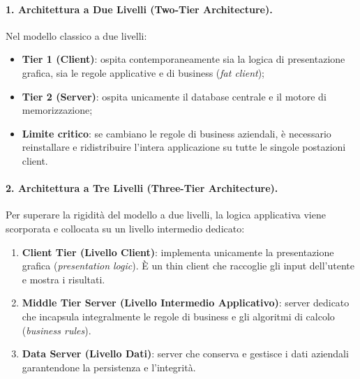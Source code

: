 \documentclass[12pt]{extarticle}
\begin{document}
\paragraph{1. Architettura a Due Livelli (Two-Tier Architecture).}
Nel modello classico a due livelli:
\begin{itemize}
    \item \textbf{Tier 1 (Client)}: ospita contemporaneamente sia la logica di presentazione grafica, sia le regole applicative e di business (\textit{fat client});
    \item \textbf{Tier 2 (Server)}: ospita unicamente il database centrale e il motore di memorizzazione;
    \item \textbf{Limite critico}: se cambiano le regole di business aziendali, è necessario reinstallare e ridistribuire l'intera applicazione su tutte le singole postazioni client.
\end{itemize}

\paragraph{2. Architettura a Tre Livelli (Three-Tier Architecture).}
Per superare la rigidità del modello a due livelli, la logica applicativa viene scorporata e collocata su un livello intermedio dedicato:
\begin{enumerate}
    \item \textbf{Client Tier (Livello Client)}: implementa unicamente la presentazione grafica (\textit{presentation logic}). È un thin client che raccoglie gli input dell'utente e mostra i risultati.
    \item \textbf{Middle Tier Server (Livello Intermedio Applicativo)}: server dedicato che incapsula integralmente le regole di business e gli algoritmi di calcolo (\textit{business rules}).
    \item \textbf{Data Server (Livello Dati)}: server che conserva e gestisce i dati aziendali garantendone la persistenza e l'integrità.
\end{enumerate}
\end{document}
